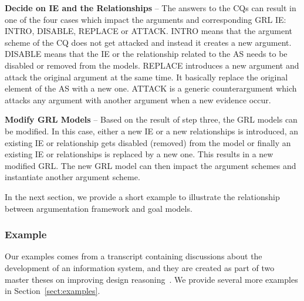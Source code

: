 \textbf{Decide on IE and the Relationships} -- The answers to the CQs can result in one of the four cases which impact the arguments and corresponding GRL IE: \textsf{INTRO}, \textsf{DISABLE}, \textsf{REPLACE} or \textsf{ATTACK}.  \textsf{INTRO} means that the argument scheme of the CQ does not get attacked and instead it creates a new argument. \textsf{DISABLE} means that the IE or the relationship related to the AS needs to be disabled or removed from the models. \textsf{REPLACE} introduces a new argument and attack the original argument at the same time. It basically replace the original element of the AS with a new one.  \textsf{ATTACK} is a generic counterargument which attacks any argument with another argument when a new evidence occur.  

\textbf{Modify GRL Models} -- Based on the result of step three, the GRL models can be modified. In this case, either a new IE or a new relationships is introduced, an existing IE or relationship gets disabled (removed) from the model or finally an existing IE or relationships is replaced by a new one. This results in a new modified GRL. The new GRL model can then impact the argument schemes and instantiate another argument scheme.   

In the next section, we provide a short example to illustrate the relationship between argumentation framework and goal models. 

\subsubsection*{Example}
\label{sect:methodology-example}

Our examples comes from a transcript containing discussions about the development of an information system, and they are created as part of two master theses on improving design reasoning~\cite{masterthesis1,masterthesis2}. We provide several more examples in Section~\ref{sect:examples}.

